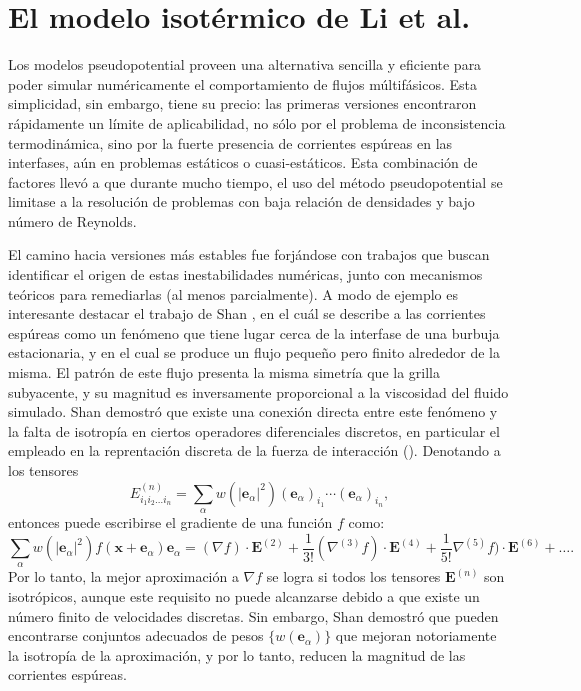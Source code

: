 \section{El modelo isot\'ermico de Li et al.}

Los modelos pseudopotential proveen una alternativa sencilla y eficiente para poder simular num\'ericamente el comportamiento de flujos m\'ultif\'asicos. Esta simplicidad, sin embargo, tiene su precio: las primeras versiones encontraron r\'apidamente un l\'imite de aplicabilidad, no s\'olo por el problema de inconsistencia termodin\'amica, sino por la fuerte presencia de corrientes esp\'ureas en las interfases, a\'un en problemas est\'aticos o cuasi-est\'aticos. Esta combinaci\'on de factores llev\'o a que durante mucho tiempo, el uso del m\'etodo pseudopotential se limitase a la resoluci\'on de problemas con baja relaci\'on de densidades y bajo n\'umero de Reynolds.

El camino hacia versiones m\'as estables fue forj\'andose con trabajos que buscan identificar el origen de estas inestabilidades num\'ericas, junto con mecanismos te\'oricos para remediarlas (al menos parcialmente). A modo de ejemplo es interesante destacar el trabajo de Shan \cite{shan_analysis_2006}, en el cu\'al se describe a las corrientes esp\'ureas como un fen\'omeno que tiene lugar cerca de la interfase de una burbuja estacionaria, y en el cual se produce un flujo peque\~no pero finito alrededor de la misma. El patr\'on de este flujo presenta la misma simetr\'ia que la grilla subyacente, y su magnitud es inversamente proporcional a la viscosidad del fluido simulado. Shan demostr\'o que existe una conexi\'on directa entre este fen\'omeno y la falta de isotrop\'ia en ciertos operadores diferenciales discretos, en particular el empleado en la reprentaci\'on discreta de la fuerza de interacci\'on (). Denotando a los tensores 
\begin{equation}
	E^{(n)}_{i_1i_2\ldots i_n} = \sum_{\alpha}w(|\bm{e}_{\alpha}|^2)(\bm{e}_{\alpha})_{i_1} \cdots (\bm{e}_{\alpha})_{i_n},
\end{equation}
entonces puede escribirse el gradiente de una funci\'on $f$ como:
\begin{equation}
	\sum_{\alpha}w(|\bm{e}_{\alpha}|^2) f(\bm{x}+\bm{e}_{\alpha})\bm{e}_{\alpha}=(\nabla f)\cdot \bm{E}^{(2)} + \dfrac{1}{3!}(\nabla^{(3)} f)\cdot \bm{E}^{(4)} + \dfrac{1}{5!}\nabla^{(5)} f)\cdot \bm{E}^{(6)} + \ldots.
\end{equation}
Por lo tanto, la mejor aproximaci\'on a $\nabla f$ se logra si todos los tensores $\bm{E}^{(n)}$ son isotr\'opicos, aunque este requisito no puede alcanzarse debido a que existe un n\'umero finito de  velocidades discretas. Sin embargo, Shan demostr\'o que pueden encontrarse conjuntos adecuados de pesos $\{ w(\bm{e}_{\alpha})\}$ que mejoran notoriamente la isotrop\'ia de la aproximaci\'on, y por lo tanto, reducen la magnitud de las corrientes esp\'ureas.

